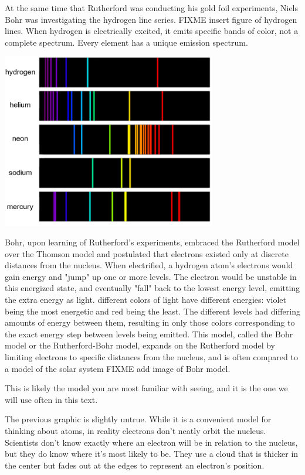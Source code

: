 At the same time that Rutherford was conducting his gold foil experiments, Niels 
Bohr was investigating the hydrogen line series. FIXME insert figure of hydrogen 
lines. When hydrogen is electrically excited, it emits specific bands of color, 
not a complete spectrum. Every element has a unique emission spectrum.

\includegraphics[width=0.7\textwidth]{spectral_lines.png}

Bohr, upon learning of Rutherford's experiments, 
embraced the Rutherford model over the Thomson model and postulated that electrons 
existed only at discrete distances from the nucleus. When electrified, a hydrogen 
atom's electrons would gain energy and "jump" up one or more levels. The electron 
would be unstable in this energized state, and eventually "fall" back to the 
lowest energy level, emitting the extra energy as light. different colors of 
light have different energies: violet being the most energetic and red being the 
least. The different levels had differing amounts of energy between them, 
resulting in only those colors corresponding to the exact energy step between 
levels being emitted. This model, called the Bohr model or the Rutherford-Bohr 
model, expands on the Rutherford model by limiting electrons to specific 
distances from the nucleus, and is often compared to a model of the solar system 
FIXME add image of Bohr model. 

This is likely the model you are most familiar with seeing, and it is the one we 
will use often in this text. 


The previous graphic is slightly untrue. While it is a convenient model for 
thinking about atoms, in reality electrons don't neatly orbit the nucleus. 
Scientists don't know exactly where an electron will be in relation to the 
nucleus, but they do know where it's most likely to be. They use a cloud that is 
thicker in the center but fades out at the edges to represent an electron's 
position.


